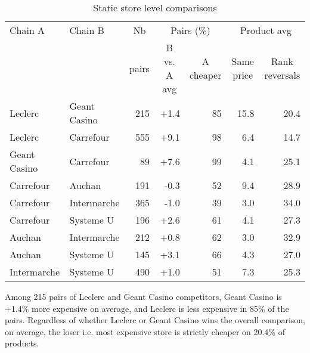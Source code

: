 \documentclass[english]{article}
\begin{document}
\begin{table}
\caption{Static store level comparisons}
\label{tab:static_compa_15km}
\begin{threeparttable}
\begin{tabular}{llr|rr|rr}
\toprule
\toprule
    Chain A & Chain B & \multicolumn{1}{c|}{Nb} & \multicolumn{2}{c|}{Pairs  (\%)} & \multicolumn{2}{c}{Product avg} \\
          &       & \multicolumn{1}{c|}{pairs} & \multicolumn{1}{c}{B vs. A avg} & \multicolumn{1}{c|}{A cheaper } & \multicolumn{1}{c}{Same price} & \multicolumn{1}{c}{Rank reversals} \\
    \midrule
    Leclerc & Geant Casino & 215   & +1.4  & 85    & 15.8  & 20.4 \\
    Leclerc & Carrefour & 555   & +9.1  & 98    & 6.4   & 14.7 \\
    Geant Casino & Carrefour & 89    & +7.6  & 99    & 4.1   & 25.1 \\
    Carrefour & Auchan & 191   & -0.3  & 52    & 9.4   & 28.9 \\
    Carrefour & Intermarche & 365   & -1.0  & 39    & 3.0   & 34.0 \\
    Carrefour & Systeme U & 196   & +2.6  & 61    & 4.1   & 27.3 \\
    Auchan & Intermarche & 212   & +0.8  & 62    & 3.0   & 32.9 \\
    Auchan & Systeme U & 145   & +3.1  & 66    & 4.3   & 27.0 \\
    Intermarche & Systeme U & 490   & +1.0  & 51    & 7.3   & 25.3 \\
    \bottomrule
    \bottomrule
\end{tabular}
\begin{tablenotes}
      \small
      \item Among 215 pairs of Leclerc and Geant Casino competitors, Geant Casino is +1.4\% more expensive on average, and Leclerc is less expensive in 85\% of the pairs. Regardless of whether Leclerc or Geant Casino wins the overall comparison, on average, the loser i.e. most expensive store is strictly cheaper on 20.4\% of products.
\end{tablenotes}
\end{threeparttable}
\end{table}
\end{document}
